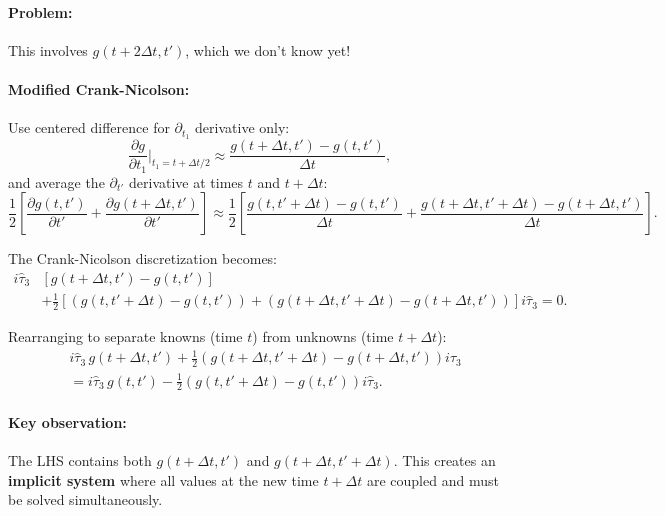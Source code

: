 \documentclass[11pt]{article}
\begin{document}
\paragraph{Problem:} This involves $g(t+2\Delta t, t')$, which we don't know yet!

\paragraph{Modified Crank-Nicolson:} Use centered difference for $\partial_{t_1}$ derivative only:
\begin{equation}
\frac{\partial g}{\partial t_1}\bigg|_{t_1=t+\Delta t/2} \approx \frac{g(t+\Delta t, t') - g(t, t')}{\Delta t},
\end{equation}
and average the $\partial_{t'}$ derivative at times $t$ and $t+\Delta t$:
\begin{equation}
\frac{1}{2}\left[\frac{\partial g(t, t')}{\partial t'} + \frac{\partial g(t+\Delta t, t')}{\partial t'}\right] \approx \frac{1}{2}\left[\frac{g(t, t'+\Delta t) - g(t, t')}{\Delta t} + \frac{g(t+\Delta t, t'+\Delta t) - g(t+\Delta t, t')}{\Delta t}\right].
\end{equation}

The Crank-Nicolson discretization becomes:
\begin{equation}
\begin{split}
i\hat{\tau}_3 &[g(t+\Delta t, t') - g(t, t')] \\
&+ \frac{1}{2}\left[(g(t, t'+\Delta t) - g(t, t')) + (g(t+\Delta t, t'+\Delta t) - g(t+\Delta t, t'))\right] i\hat{\tau}_3 = 0.
\end{split}
\end{equation}

Rearranging to separate knowns (time $t$) from unknowns (time $t+\Delta t$):
\begin{equation}
\boxed{
\begin{split}
&i\hat{\tau}_3 \, g(t+\Delta t, t') + \frac{1}{2}(g(t+\Delta t, t'+\Delta t) - g(t+\Delta t, t')) i\hat{\tau}_3 \\
&= i\hat{\tau}_3 \, g(t, t') - \frac{1}{2}(g(t, t'+\Delta t) - g(t, t')) i\hat{\tau}_3.
\end{split}
}
\end{equation}

\paragraph{Key observation:} The LHS contains both $g(t+\Delta t, t')$ and $g(t+\Delta t, t'+\Delta t)$. This creates an \textbf{implicit system} where all values at the new time $t+\Delta t$ are coupled and must be solved simultaneously.
\end{document}
